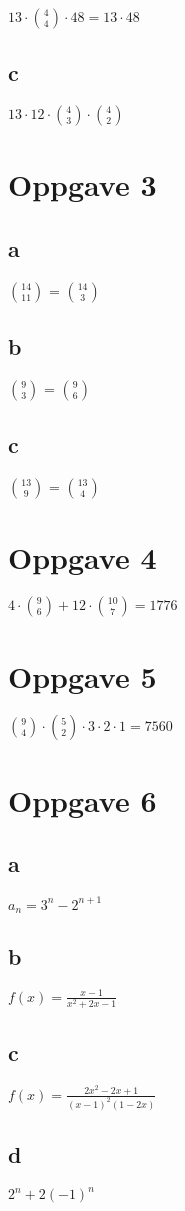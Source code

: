 \documentclass{article}
\begin{document}
$13 \cdotp {4 \choose 4} \cdotp 48=13 \cdotp 48$

 \subsection*{c} 
 $13 \cdotp 12 \cdotp {4 \choose 3} \cdotp {4 \choose 2}$
 
 \section*{Oppgave 3}
 
 \subsection*{a}
 
 $14 \choose 11$ = $14 \choose 3$
 
 \subsection*{b}
 
 $9 \choose 3$ = $9 \choose 6$
 
 \subsection*{c}
 
 $13 \choose 9$ = $13 \choose 4$
 
 \section*{Oppgave 4}
 
 $4 \cdotp {9 \choose 6} + 12 \cdotp {10 \choose 7} = 1776$
 
\section*{Oppgave 5}

${9 \choose 4} \cdotp {5 \choose 2} \cdotp 3 \cdotp 2 \cdotp 1 = 7560$

\section*{Oppgave 6}

\subsection*{a}

$a_{n} = 3^{n} - 2^{n+1}$

\subsection*{b}

$f(x) = \frac{x-1}{x^{2} + 2x -1}$

\subsection*{c}

$f(x) = \frac{2x^{2}-2x+1}{(x-1)^{2}(1-2x)}$

\subsection*{d}

$2^{n}+2(-1)^{n}$
\end{document}
